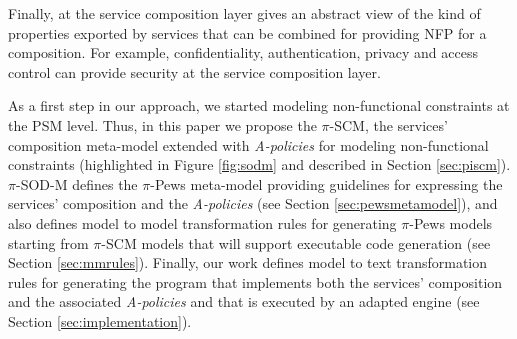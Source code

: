 Finally, at the service composition layer gives an abstract view of the kind of properties exported by services that can be combined for providing NFP for a composition. For example, confidentiality, authentication, privacy and access control can provide security at the service composition layer.

As a first step in our approach,  we started modeling non-functional constraints at the PSM level. Thus, in this paper we  propose the $\pi$-SCM, the services' composition meta-model extended with {\em A-policies} for modeling non-functional constraints (highlighted in Figure  \ref{fig:sodm} and described in Section \ref{sec:piscm}).  $\pi$-SOD-M defines the $\pi$-{\sc Pews}  meta-model providing guidelines for expressing the services' composition and the {\em A-policies} (see Section \ref{sec:pewsmetamodel}), and also defines model to model transformation rules for generating  $\pi$-{\sc Pews} models starting from $\pi$-SCM models that will support executable code generation (see Section \ref{sec:mmrules}). Finally, our work defines model to text transformation rules for generating the program that implements both the services' composition and the associated {\em A-policies} and that is executed by an adapted engine (see Section \ref{sec:implementation}).

